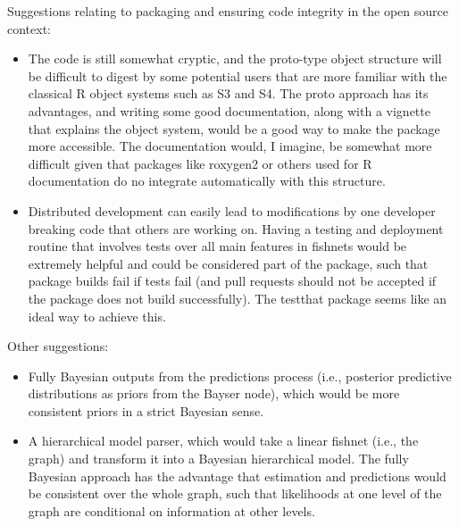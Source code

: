 \documentclass{dragonfly-report}\usepackage[]{graphicx}\usepackage[]{color}
\begin{document}
Suggestions relating to packaging and ensuring code integrity in the open source context:

\begin{itemize}

\item The code is still somewhat cryptic, and the proto-type object structure will be difficult to digest by some potential users that are more familiar with the classical R object systems such as S3 and S4. The proto approach has its advantages, and writing some good documentation, along with a vignette that explains the object system, would be a good way to make the package more accessible. The documentation would, I imagine, be somewhat more difficult given that packages like roxygen2 or others used for R documentation do no integrate automatically with this structure. 

\item Distributed development can easily lead to modifications by one developer breaking code that others are working on. Having a testing and deployment routine that involves tests over all main features in fishnets would be extremely helpful and could be considered part of the package, such that package builds fail if tests fail (and pull requests should not be accepted if the package does not build successfully). The testthat package seems like an ideal way to achieve this.

\end{itemize}

Other suggestions:

\begin{itemize}

\item Fully Bayesian outputs from the predictions process (i.e., posterior predictive distributions as priors from the Bayser node), which would be more consistent priors in a strict Bayesian sense.

\item A hierarchical model parser, which would take a linear fishnet (i.e., the graph) and transform it into a Bayesian hierarchical model. The fully Bayesian approach has the advantage that estimation and predictions would be consistent over the whole graph, such that likelihoods at one level of the graph are conditional on information at other levels. 

\end{itemize}

\printbibliography
\end{document}

